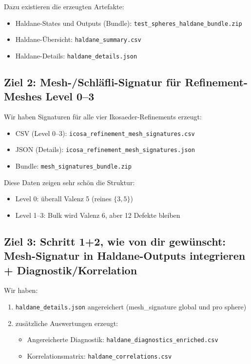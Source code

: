 \documentclass[11pt,a4paper]{article}
\begin{document}
Dazu existieren die erzeugten Artefakte:
\begin{itemize}[leftmargin=*,itemsep=0.5em]
    \item Haldane-States und Outputs (Bundle): \texttt{test\_spheres\_haldane\_bundle.zip}
    \item Haldane-Übersicht: \texttt{haldane\_summary.csv}
    \item Haldane-Details: \texttt{haldane\_details.json}
\end{itemize}

\subsection{Ziel 2: Mesh-/Schläfli-Signatur für Refinement-Meshes Level 0--3}

Wir haben Signaturen für alle vier Ikosaeder-Refinements erzeugt:
\begin{itemize}[leftmargin=*,itemsep=0.5em]
    \item CSV (Level 0--3): \texttt{icosa\_refinement\_mesh\_signatures.csv}
    \item JSON (Details): \texttt{icosa\_refinement\_mesh\_signatures.json}
    \item Bundle: \texttt{mesh\_signatures\_bundle.zip}
\end{itemize}

Diese Daten zeigen sehr schön die Struktur:
\begin{itemize}[leftmargin=*,itemsep=0.5em]
    \item Level 0: überall Valenz 5 (reines $\{3,5\}$)
    \item Level 1--3: Bulk wird Valenz 6, aber 12 Defekte bleiben
\end{itemize}

\subsection{Ziel 3: Schritt 1+2, wie von dir gewünscht: Mesh-Signatur in Haldane-Outputs integrieren + Diagnostik/Korrelation}

Wir haben:
\begin{enumerate}[leftmargin=*,itemsep=0.5em]
    \item \texttt{haldane\_details.json} angereichert (mesh\_signature global und pro sphere)
    \item zusätzliche Auswertungen erzeugt:
    \begin{itemize}[leftmargin=*,itemsep=0.5em]
        \item Angereicherte Diagnostik: \texttt{haldane\_diagnostics\_enriched.csv}
        \item Korrelationsmatrix: \texttt{haldane\_correlations.csv}
    \end{itemize}
\end{enumerate}
\end{document}

